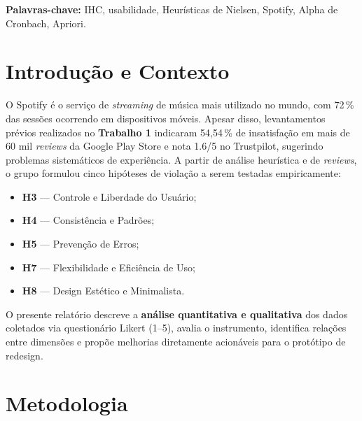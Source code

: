 \documentclass[12pt,a4paper]{article}
\begin{document}
\vspace{0.5cm}\noindent
\textbf{Palavras-chave:} IHC, usabilidade, Heurísticas de Nielsen, Spotify, Alpha de
Cronbach, Apriori.

\tableofcontents
\newpage

\section{Introdução e Contexto}
\label{sec:intro}

O Spotify é o serviço de \emph{streaming} de música mais utilizado no mundo, com
72\,\% das sessões ocorrendo em dispositivos móveis. Apesar disso, levantamentos prévios
realizados no \textbf{Trabalho 1} indicaram 54{,}54\,\% de insatisfação em mais de 60 mil
\emph{reviews} da Google Play Store e nota 1.6/5 no Trustpilot, sugerindo problemas
sistemáticos de experiência. A partir de análise heurística e de \emph{reviews}, o grupo
formulou cinco hipóteses de violação a serem testadas empiricamente:

\begin{itemize}[leftmargin=*, itemsep=2pt]
  \item \textbf{H3} --- Controle e Liberdade do Usuário;
  \item \textbf{H4} --- Consistência e Padrões;
  \item \textbf{H5} --- Prevenção de Erros;
  \item \textbf{H7} --- Flexibilidade e Eficiência de Uso;
  \item \textbf{H8} --- Design Estético e Minimalista.
\end{itemize}

O presente relatório descreve a \textbf{análise quantitativa e qualitativa} dos
dados coletados via questionário Likert (1--5), avalia o instrumento, identifica
relações entre dimensões e propõe melhorias diretamente acionáveis para o protótipo
de redesign.

\section{Metodologia}
\label{sec:metod}
\end{document}
